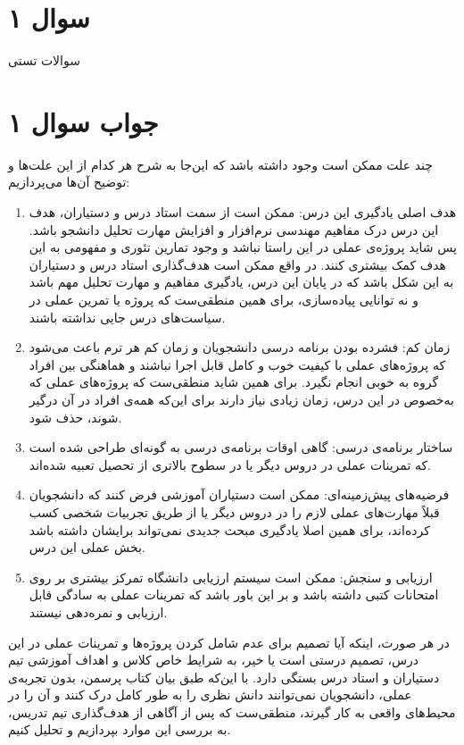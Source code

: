 \section*{سوال ۱}

سوالات تستی
\section*{جواب سوال ۱}

چند علت ممکن است وجود داشته باشد که این‌جا به شرح هر کدام از این علت‌ها و توضیح آن‌ها می‌پردازیم:

\begin{enumerate}
	\item هدف اصلی یادگیری این درس: ممکن است از سمت استاد درس و دستیاران، هدف این درس درک مفاهیم مهندسی نرم‌افزار و افزایش مهارت تحلیل دانشجو باشد. پس شاید پروژه‌ی عملی در این راستا نباشد و وجود تمارین تئوری و مفهومی به این هدف کمک بیشتری کنند. در واقع ممکن است هدف‌گذاری استاد درس و دستیاران به این شکل باشد که در پایان این درس، یادگیری مفاهیم و مهارت تحلیل مهم باشد و نه توانایی پیاده‌سازی، برای همین منطقی‌ست که پروژه یا تمرین عملی در سیاست‌های درس جایی نداشته باشند.
	
	\item زمان کم: فشرده بودن برنامه درسی دانشجویان و زمان کم هر ترم باعث می‌شود که پروژه‌های عملی با کیفیت خوب و کامل قابل اجرا نباشند و هماهنگی بین افراد گروه به خوبی انجام نگیرد. برای همین شاید منطقی‌ست که پروژه‌های عملی که به‌خصوص در این درس، زمان زیادی نیاز دارند برای این‌که همه‌ی افراد در آن درگیر شوند، حذف شود.
	
	\item ساختار برنامه‌ی درسی: گاهی اوقات برنامه‌ی درسی به گونه‌ای طراحی شده است که تمرینات عملی در دروس دیگر یا در سطوح بالاتری از تحصیل تعبیه شده‌اند.
	
	\item فرضیه‌های پیش‌زمینه‌ای: ممکن است دستیاران آموزشی فرض کنند که دانشجویان قبلاً مهارت‌های عملی لازم را در دروس دیگر یا از طریق تجربیات شخصی کسب کرده‌اند، برای همین اصلا یادگیری مبحث جدیدی نمی‌تواند برایشان داشته باشد بخش عملی این درس.
	
	\item ارزیابی و سنجش: ممکن است سیستم ارزیابی دانشگاه تمرکز بیشتری بر روی امتحانات کتبی داشته باشد و بر این باور باشد که تمرینات عملی به سادگی قابل ارزیابی و نمره‌دهی نیستند.
\end{enumerate}

در هر صورت، اینکه آیا تصمیم برای عدم شامل کردن پروژه‌ها و تمرینات عملی در این درس، تصمیم درستی است یا خیر، به شرایط خاص کلاس و اهداف آموزشی تیم دستیاران و استاد درس بستگی دارد. با این‌که طبق بیان کتاب پرسمن، بدون تجربه‌ی عملی، دانشجویان نمی‌توانند دانش نظری را به طور کامل درک کنند و آن را در محیط‌های واقعی به کار گیرند، منطقی‌ست که پس از آگاهی از هدف‌گذاری تیم تدریس، به بررسی این موارد بپردازیم و تحلیل کنیم.

